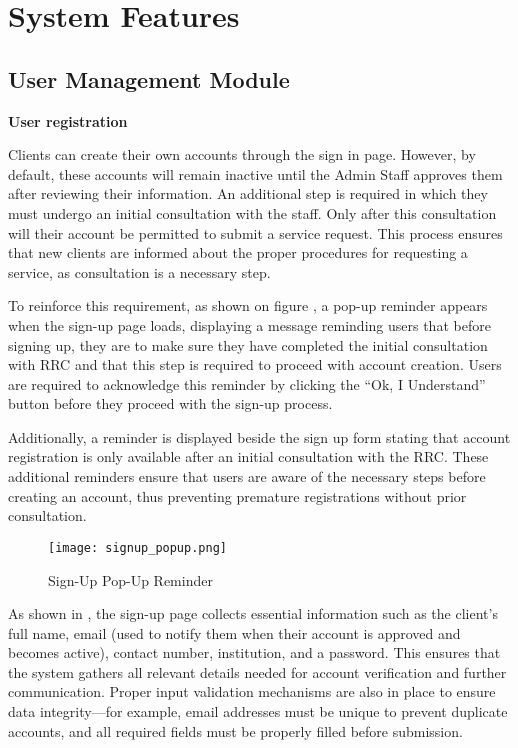 \section{System Features}

\subsection{User Management Module}

\textbf{User registration}

Clients can create their own accounts through the sign in page. However, by default, these accounts will remain inactive until the Admin Staff approves them after reviewing their information. An additional step is required in which they must undergo an initial consultation with the staff. Only after this consultation will their account be permitted to submit a service request. This process ensures that new clients are informed about the proper procedures for requesting a service, as consultation is a necessary step.

To reinforce this requirement, as shown on figure , a pop-up reminder appears when the sign-up page loads, displaying a message reminding users that before signing up, they are to make sure they have completed the initial consultation with RRC and that this step is required to proceed with account creation.
Users are required to acknowledge this reminder by clicking the “Ok, I Understand” button before they proceed with the sign-up process.

Additionally, a reminder is displayed beside the sign up form stating that account registration is only available after an initial consultation with the RRC. These additional reminders ensure that users are aware of the necessary steps before creating an account, thus preventing premature registrations without prior consultation.

\begin{figure}[h]
	\centering 
	\texttt{[image: signup\_popup.png]}
	\caption{Sign-Up Pop-Up Reminder}
	\label{fig:signup_popup}
\end{figure}

As shown in , the sign-up page collects essential information such as the client's full name, email (used to notify them when their account is approved and becomes active), contact number, institution, and a password. This ensures that the system gathers all relevant details needed for account verification and further communication. Proper input validation mechanisms are also in place to ensure data integrity—for example, email addresses must be unique to prevent duplicate accounts, and all required fields must be properly filled before submission.

